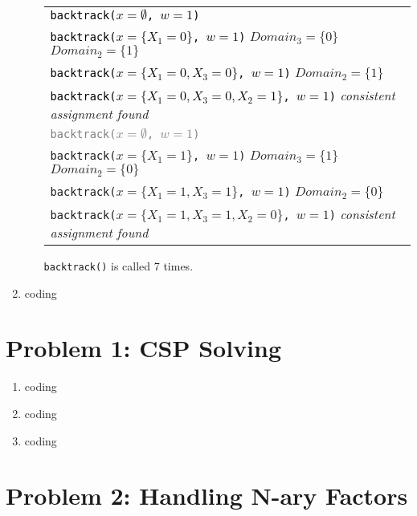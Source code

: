 \documentclass[10pt]{article}
\begin{document}
\begin{enumerate}[label=(\alph*)]
\begin{enumerate}[label=\roman*.]
		\begin{tabular}{l}
		\textcolor{black}{\texttt{backtrack($x = \emptyset$, $w = 1$)}}\\
		\textcolor{black}{\texttt{backtrack($x = \{ X_1 = 0 \}$, $w = 1$)}} $Domain_3 = \{ 0 \}$ $Domain_2 = \{ 1 \}$ \\
		\textcolor{black}{\texttt{backtrack($x = \{ X_1 = 0, X_3 = 0 \}$, $w = 1$)}} $Domain_2 = \{ 1 \}$\\
		\textcolor{black}{\texttt{backtrack($x = \{ X_1 = 0, X_3 = 0, X_2 = 1 \}$, $w = 1$)}} \textit{consistent assignment found}\\
		\hline
		\textcolor{gray}{\texttt{backtrack($x = \emptyset$, $w = 1$)}}\\
		\texttt{backtrack($x = \{ X_1 = 1 \}$, $w = 1$)} $Domain_3 = \{ 1 \}$ $Domain_2 = \{ 0 \}$\\
		\texttt{backtrack($x = \{ X_1 = 1, X_3 = 1 \}$, $w = 1$)} $Domain_2 = \{ 0 \}$\\
		\texttt{backtrack($x = \{ X_1 = 1, X_3 = 1, X_2 = 0 \}$, $w = 1$)} \textit{consistent assignment found}\\
  		\end{tabular}
  		
  		\texttt{backtrack()} is called 7 times.
	\end{enumerate}
	
	\item coding

\end{enumerate}

\section*{\normalsize Problem 1: CSP Solving}

\begin{enumerate}[label=(\alph*)]

  \item coding
  
  \item coding
  
  \item coding

\end{enumerate}

\section*{\normalsize Problem 2: Handling N-ary Factors}
\end{document}
